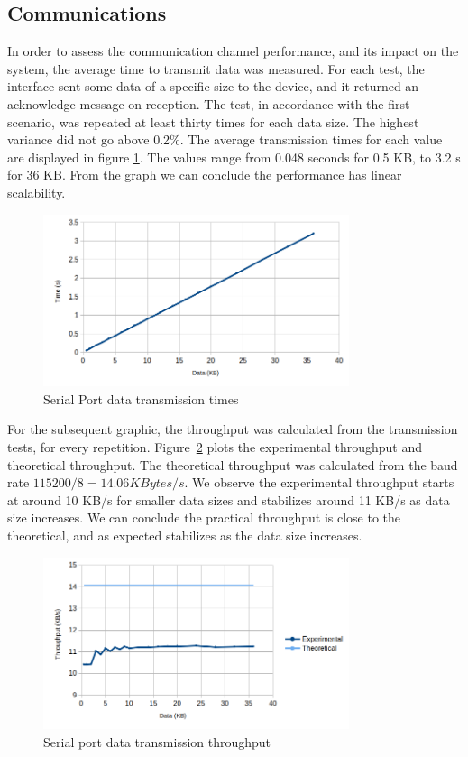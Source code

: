 \subsection{Communications}\label{chap:evaluation:performance:comms}

In order to assess the communication channel performance, and its impact on the system, the average time to transmit data was measured. For each test, the interface sent some data of a specific size to the device, and it returned an acknowledge message on reception. The test, in accordance with the first scenario, was repeated at least thirty times for each data size. The highest variance did not go above 0.2\%.
The average transmission times for each value are displayed in figure \ref{fig:comms:time}.
The values range from 0.048 seconds for 0.5 KB, to 3.2 s for 36 KB.
From the graph we can conclude the performance has linear scalability.

\begin{figure}[h!]
	\centering
	\includegraphics[width=0.8\textwidth]{./Images/comms-time.png}
	\caption{Serial Port data transmission times}
	\label{fig:comms:time}
\end{figure}

For the subsequent graphic, the throughput was calculated from the transmission tests, for every repetition.
Figure~\ref{fig:comms:tput} plots the experimental throughput and theoretical throughput. The theoretical throughput was calculated from the baud rate \(115200/8 = 14.06 KBytes/s\).
We observe the experimental throughput starts at around 10 KB/s for smaller data sizes and stabilizes around 11 KB/s as data size increases.
We can conclude the practical throughput is close to the theoretical, and as expected stabilizes as the data size increases.

\begin{figure}[h!]
	\centering
	\includegraphics[width=0.8\textwidth]{./Images/comms-tput.png}
	\caption{Serial port data transmission throughput}
	\label{fig:comms:tput}
\end{figure}

